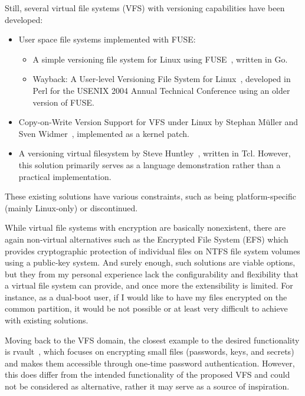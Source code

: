 Still, several virtual file systems (VFS) with versioning capabilities have been developed:

\begin{itemize}
    \item User space file systems implemented with FUSE:
    \begin{itemize}
        \item A simple versioning file system for Linux using FUSE~\cite{simple_vfs}, written in Go.
        \item Wayback: A User-level Versioning File System for Linux~\cite{wayback_vfs}, developed in Perl for the USENIX 2004 Annual Technical Conference using an older version of FUSE\@.
    \end{itemize}
    \item Copy-on-Write Version Support for VFS under Linux by Stephan Müller and Sven Widmer~\cite{vvfs}, implemented as a kernel patch.
    \item A versioning virtual filesystem by Steve Huntley~\cite{huntley_vvfs}, written in Tcl.
    However, this solution primarily serves as a language demonstration rather than a practical implementation.
\end{itemize}

These existing solutions have various constraints, such as being platform-specific (mainly Linux-only) or discontinued.

While virtual file systems with encryption are basically nonexistent, there are again non-virtual alternatives such as the Encrypted File System (EFS) which provides cryptographic protection of individual files on NTFS file system volumes using a public-key system.
And surely enough, such solutions are viable options, but they from my personal experience lack the configurability and flexibility that a virtual file system can provide, and once more the extensibility is limited.
For instance, as a dual-boot user, if I would like to have my files encrypted on the common partition, it would be not possible or at least very difficult to achieve with existing solutions.

Moving back to the VFS domain, the closest example to the desired functionality is rvault~\cite{rvault}, which focuses on encrypting small files (passwords, keys, and secrets) and makes them accessible through one-time password authentication.
However, this does differ from the intended functionality of the proposed VFS and could not be considered as alternative, rather it may serve as a source of inspiration.

